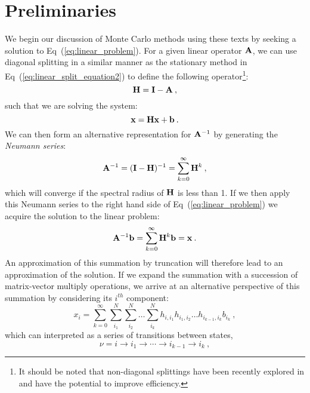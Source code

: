 \section{Preliminaries}
\label{sec:mc_preliminaries}
We begin our discussion of Monte Carlo methods using these texts by
seeking a solution to Eq~(\ref{eq:linear_problem}). For a given linear
operator $\mathbf{A}$, we can use diagonal splitting in a similar manner
as the stationary method in Eq~(\ref{eq:linear_split_equation2}) to
define the following operator\footnote{It should be noted that
  non-diagonal splittings have been recently explored in
  \citep{srinivasan_monte_2010} and have the potential to improve
  efficiency.}:
\begin{equation}
  \mathbf{H} = \mathbf{I} - \mathbf{A}\:,
  \label{eq:linear_mc_iteration_matrix}
\end{equation}
such that we are solving the system:
\begin{equation}
  \mathbf{x} = \mathbf{H} \mathbf{x} + \mathbf{b}\:.
  \label{eq:richardson_split}
\end{equation}
We can then form an alternative representation for $\mathbf{A}^{-1}$ by
generating the \textit{Neumann series}:
\begin{equation}
  \mathbf{A}^{-1} = (\mathbf{I}-\mathbf{H})^{-1} = \sum_{k=0}^{\infty} \mathbf{H}^k\:,
  \label{eq:neumann_series}
\end{equation}
which will converge if the spectral radius of $\mathbf{H}$ is less than
1. If we then apply this Neumann series to the right hand side of
Eq~(\ref{eq:linear_problem}) we acquire the solution to the linear
problem:
\begin{equation}
  \mathbf{A}^{-1}\mathbf{b} = \sum_{k=0}^{\infty} \mathbf{H}^k\mathbf{b} = \mathbf{x}\:.
  \label{eq:neumann_solution}
\end{equation}
An approximation of this summation by truncation will therefore lead
to an approximation of the solution. If we expand the summation with a
succession of matrix-vector multiply operations, we arrive at an
alternative perspective of this summation by considering its $i^{th}$
component:
\begin{equation}
  x_i = \sum_{k=0}^{\infty}\sum_{i_1}^{N}\sum_{i_2}^{N}\ldots
  \sum_{i_k}^{N}h_{i,i_1}h_{i_1,i_2}\ldots h_{i_{k-1},i_k}b_{i_k}\:,
  \label{eq:expanded_neumann_solution}
\end{equation}
which can interpreted as a series of transitions between states,
\begin{equation}
 \nu = i \rightarrow i_1 \rightarrow \cdots \rightarrow i_{k-1}
 \rightarrow i_{k}\:,
  \label{eq:mc_walk_permutation}
\end{equation}
